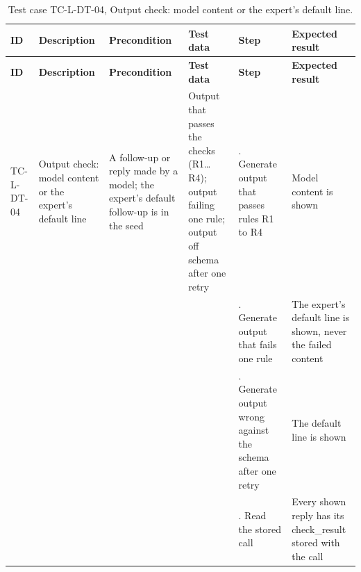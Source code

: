 {\footnotesize{}\renewcommand{\arraystretch}{1.1}
\begin{longtable}{|>{\raggedright\arraybackslash}p{}|>{\raggedright\arraybackslash}p{}|>{\raggedright\arraybackslash}p{}|>{\raggedright\arraybackslash}p{}|>{\raggedright\arraybackslash}p{}|>{\raggedright\arraybackslash}p{}|}
\caption{Test case TC-L-DT-04, Output check: model content or the expert's default line.} \\
\hline
\textbf{ID} & \textbf{Description} & \textbf{Precondition} & \textbf{Test data} & \textbf{Step} & \textbf{Expected result} \\ \hline
\endfirsthead
\hline
\textbf{ID} & \textbf{Description} & \textbf{Precondition} & \textbf{Test data} & \textbf{Step} & \textbf{Expected result} \\ \hline
\endhead
TC-L-DT-04 & Output check: model content or the expert's default line & A follow-up or reply made by a model; the expert's default follow-up is in the seed & Output that passes the checks (R1…R4); output failing one rule; output off schema after one retry & 1. Generate output that passes rules R1 to R4 & Model content is shown \\ \cline{5-6}
 &  &  &  & 2. Generate output that fails one rule & The expert's default line is shown, never the failed content \\ \cline{5-6}
 &  &  &  & 3. Generate output wrong against the schema after one retry & The default line is shown \\ \cline{5-6}
 &  &  &  & 4. Read the stored call & Every shown reply has its check\_\allowbreak{}result stored with the call \\ \hline
\end{longtable}
}

